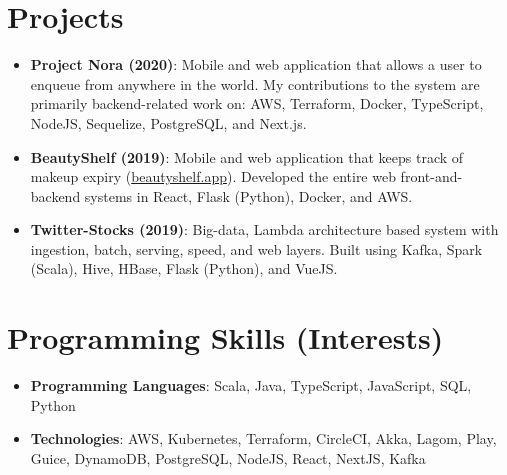 \documentclass[letterpaper,11pt]{article}
\newcommand{\resumeItem}[2]{
  \item\small{
    \textbf{#1}{: #2 \vspace{-2pt}}
  }
}
\newcommand{\resumeSubItem}[2]{\resumeItem{#1}{#2}\vspace{-4pt}}
\newcommand{\resumeSubHeadingListStart}{\begin{itemize}[leftmargin=*]}
\newcommand{\resumeSubHeadingListEnd}{\end{itemize}}
\begin{document}
\section{Projects}
  \resumeSubHeadingListStart
    \resumeSubItem{Project Nora (2020)}
      {Mobile and web application that allows a user to enqueue from anywhere in the world. My contributions to the system are primarily backend-related work on: AWS, Terraform, Docker, TypeScript, NodeJS, Sequelize, PostgreSQL, and Next.js.}
    \resumeSubItem{BeautyShelf (2019)}
      {Mobile and web application that keeps track of makeup expiry (\href{https://beautyshelf.app}{beautyshelf.app}). Developed the entire web front-and-backend systems in React, Flask (Python), Docker, and AWS.}
    \resumeSubItem{Twitter-Stocks (2019)}
      {Big-data, Lambda architecture based system with ingestion, batch, serving, speed, and web layers. Built using Kafka, Spark (Scala), Hive, HBase, Flask (Python), and VueJS.}
  \resumeSubHeadingListEnd


\section{Programming Skills (Interests)}
  \resumeSubHeadingListStart
    \resumeSubItem{Programming Languages}
      {Scala, Java, TypeScript, JavaScript, SQL, Python}
    \resumeSubItem{Technologies}
      {AWS, Kubernetes, Terraform, CircleCI, Akka, Lagom, Play, Guice, DynamoDB, PostgreSQL, NodeJS, React, NextJS, Kafka}
  \resumeSubHeadingListEnd


\end{document}
